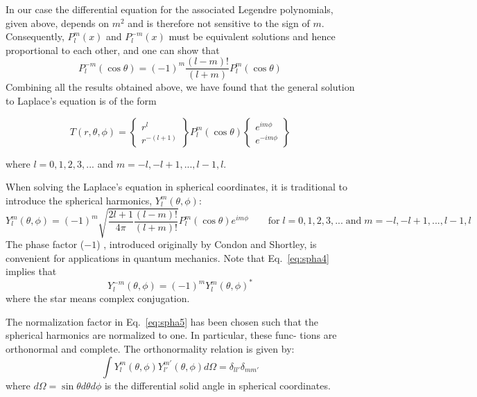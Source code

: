 In our case the differential equation for the associated Legendre polynomials, given above, depends
on $m^2$ and is therefore not sensitive to the sign of $m$.
Consequently, $P_l^m(x)$ and $P_l^{-m}(x)$ must be equivalent solutions and 
hence proportional to each other, and one can show that
\begin{equation}
P_l^{-m}(\cos\theta) = (-1)^m\frac{(l-m)!}{(l+m)} P_l^m(\cos\theta)
\label{eq:spha4}
\end{equation}
Combining all the results obtained above, we have found that the general solution to
Laplace’s equation is of the form
\begin{mdframed}[backgroundcolor=blue!5]
\[
T(r,\theta,\phi) = 
\left\{
\begin{array}{c}
r^l \\ r^{-(l+1)}
\end{array}
\right\}
P_l^m(\cos\theta) 
\left\{
\begin{array}{c}
e^{im\phi} \\ e^{-im\phi}
\end{array}
\right\}
\]
\end{mdframed}
where $l=0,1,2,3,...$ and $m=-l,-l+1,...,l-1,l$.

When solving the Laplace’s equation in spherical coordinates, it is traditional
to introduce the spherical harmonics, $Y_l^m(\theta,\phi)$:
\begin{equation}
Y_l^m(\theta,\phi) = (-1)^m \sqrt{\frac{2l+1}{4\pi} \frac{(l-m)!}{(l+m)!}} P_l^m(\cos\theta) e^{im\phi}
\qquad 
\textrm{for} \; l=0,1,2,3,... \; \textrm{and} \; m=-l,-l+1,...,l-1,l
\label{eq:spha5}
\end{equation}
The phase factor ($-1$) , introduced originally by Condon and Shortley, is convenient for
applications in quantum mechanics. Note that Eq.~\eqref{eq:spha4} implies that
\[
Y_l^{-m} (\theta, \phi) = (-1)^m Y_l^m (\theta,\phi)^* 
\]
where the star means complex conjugation.

The normalization factor in Eq.~\eqref{eq:spha5} has been
chosen such that the spherical harmonics are normalized to one. In particular, these func-
tions are orthonormal and complete. The orthonormality relation is given by:
\[
\int Y_l^m(\theta,\phi) Y_{l'}^{m'}(\theta,\phi) d\Omega = \delta_{ll'} \delta_{mm'}
\]
where $d\Omega = \sin\theta d\theta d\phi$ is the differential solid angle in spherical coordinates.

